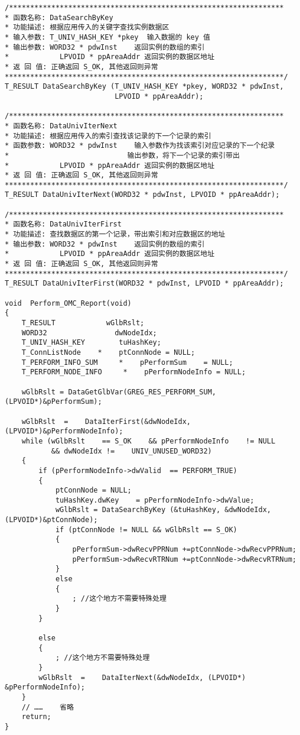 ﻿\documentclass  [11pt,twocolumn]{article}
\begin{document}
\begin{lstlisting}
/*****************************************************************
* 函数名称: DataSearchByKey
* 功能描述: 根据应用传入的关键字查找实例数据区
* 输入参数: T_UNIV_HASH_KEY *pkey  输入数据的 key 值
* 输出参数: WORD32 * pdwInst    返回实例的数组的索引
*            LPVOID * ppAreaAddr 返回实例的数据区地址
* 返 回 值: 正确返回 S_OK, 其他返回则异常　 
******************************************************************/
T_RESULT DataSearchByKey (T_UNIV_HASH_KEY *pkey, WORD32 * pdwInst, 
                          LPVOID * ppAreaAddr);

/*****************************************************************
* 函数名称: DataUnivIterNext
* 功能描述: 根据应用传入的索引查找该记录的下一个记录的索引
* 函数参数: WORD32 * pdwInst    输入参数作为找该索引对应记录的下一个纪录
*                            输出参数，将下一个记录的索引带出
*            LPVOID * ppAreaAddr 返回实例的数据区地址
* 返 回 值: 正确返回 S_OK, 其他返回则异常　 
******************************************************************/
T_RESULT DataUnivIterNext(WORD32 * pdwInst, LPVOID * ppAreaAddr);

/*****************************************************************
* 函数名称: DataUnivIterFirst
* 功能描述: 查找数据区的第一个记录，带出索引和对应数据区的地址
* 输出参数: WORD32 * pdwInst    返回实例的数组的索引
*            LPVOID * ppAreaAddr 返回实例的数据区地址
* 返 回 值: 正确返回 S_OK, 其他返回则异常　 
******************************************************************/
T_RESULT DataUnivIterFirst(WORD32 * pdwInst, LPVOID * ppAreaAddr);

void  Perform_OMC_Report(void)
{
    T_RESULT            wGlbRslt;
    WORD32                dwNodeIdx;
    T_UNIV_HASH_KEY        tuHashKey;
    T_ConnListNode    *    ptConnNode = NULL;
    T_PERFORM_INFO_SUM     *    pPerformSum    = NULL;
    T_PERFORM_NODE_INFO     *    pPerformNodeInfo = NULL;

    wGlbRslt = DataGetGlbVar(GREG_RES_PERFORM_SUM, (LPVOID*)&pPerformSum);

    wGlbRslt  =    DataIterFirst(&dwNodeIdx, (LPVOID*)&pPerformNodeInfo);
    while (wGlbRslt    == S_OK    && pPerformNodeInfo    != NULL
           && dwNodeIdx !=    UNIV_UNUSED_WORD32)
    {
        if (pPerformNodeInfo->dwValid  == PERFORM_TRUE)
        {
            ptConnNode = NULL;
            tuHashKey.dwKey    = pPerformNodeInfo->dwValue;
            wGlbRslt = DataSearchByKey (&tuHashKey, &dwNodeIdx, (LPVOID*)&ptConnNode);
            if (ptConnNode != NULL && wGlbRslt == S_OK)
            {
                pPerformSum->dwRecvPPRNum +=ptConnNode->dwRecvPPRNum;
                pPerformSum->dwRecvRTRNum +=ptConnNode->dwRecvRTRNum;
            }
            else
            {
                ; //这个地方不需要特殊处理
            }
        }

        else
        {
            ; //这个地方不需要特殊处理
        }
        wGlbRslt  =    DataIterNext(&dwNodeIdx, (LPVOID*) &pPerformNodeInfo);
    }
    // ……    省略
    return;
}
\end{lstlisting}
\end{document}
